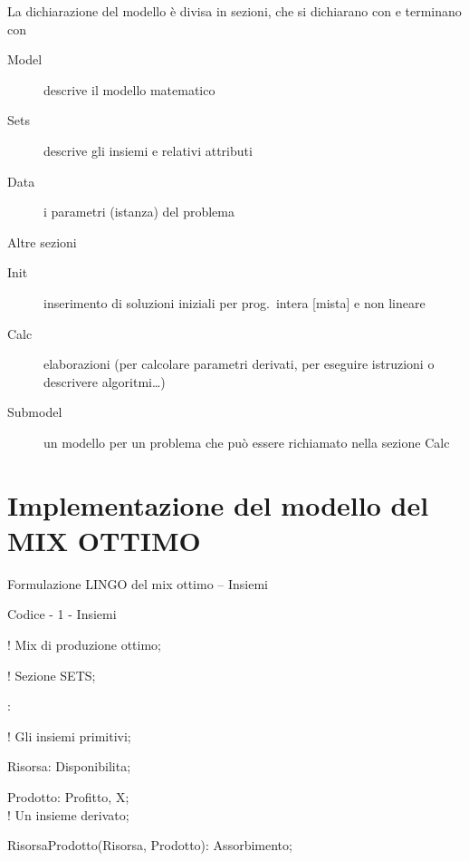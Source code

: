 \documentclass{beamer}
\def\lyxframeend{} %
\begin{document}
\lyxframeend{}
La dichiarazione del modello \`e divisa in sezioni, che si dichiarano con
  e terminano con 

\begin{description}
\item [{Model}] descrive il modello matematico
\item [{Sets}] descrive gli insiemi e relativi attributi
\item [{Data}] i parametri (istanza) del problema
\end{description}

Altre sezioni
\begin{description}
\item [{Init}] inserimento di soluzioni iniziali per prog.\ intera {[}mista{]}
e non lineare
\item [{Calc}] elaborazioni (per calcolare parametri derivati, per eseguire
istruzioni o descrivere algoritmi\ldots{})
\item [{Submodel}] un modello per un problema che pu\`o essere richiamato
nella sezione Calc
\end{description}

\lyxframeend{}\section{Implementazione del modello del MIX OTTIMO}


\lyxframeend{}

\begin{frame}{Formulazione LINGO del mix ottimo -- Insiemi}

\begin{exampleblock}
{Codice - 1 - Insiemi}

\textcolor{comment_c}{! Mix di produzione ottimo;}

\textcolor{comment_c}{! Sezione SETS;}

: 

\textcolor{comment_c}{! Gli insiemi primitivi;}

Risorsa: Disponibilita;

Prodotto: Profitto, X;\\

\textcolor{comment_c}{! Un insieme derivato;}

RisorsaProdotto(Risorsa, Prodotto): Assorbimento;

\end{exampleblock}
\end{frame}
\end{document}
